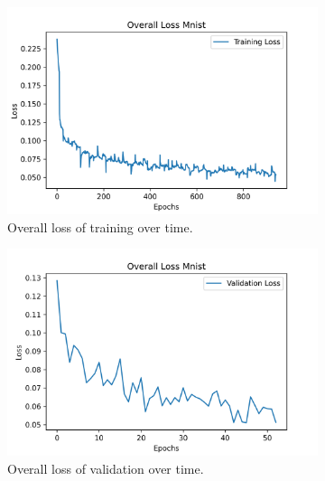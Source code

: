 \begin{figure}[!ht]
\centering
     \begin{subfigure}[b]{0.4\textwidth}
         \centering
         \includegraphics[width=\textwidth]{Images/plot_training_loss_mnist.png}
         \caption{Overall loss of training over time.}
         \label{fig:training_loss}
     \end{subfigure}
     \hfill
     \begin{subfigure}[b]{0.4\textwidth}
         \centering
         \includegraphics[width=\textwidth]{Images/plot_validation_loss_mnist.png}
         \caption{Overall loss of validation over time.}
         \label{fig:validation_loss}
     \end{subfigure}
     \hfill
     \begin{subfigure}[b]{0.4\textwidth}
         \centering

\end{subfigure}
\end{figure}
